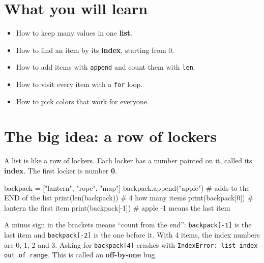 
\section{What you will learn}
\begin{itemize}[leftmargin=1.2em]
  \item How to keep many values in one \textbf{list}.
  \item How to find an item by its \textbf{index}, starting from 0.
  \item How to add items with \texttt{append} and count them with \texttt{len}.
  \item How to visit every item with a \texttt{for} loop.
  \item How to pick colors that work for everyone.
\end{itemize}

\section{The big idea: a row of lockers}
A list is like a row of lockers. Each locker has a number painted on it, called its \textbf{index}.
The first locker is number \textbf{0}.

\begin{center}
\end{center}

\begin{pycode}
backpack = ["lantern", "rope", "map"]
backpack.append("apple")    # adds to the END of the list
print(len(backpack))        # 4   how many items
print(backpack[0])          # lantern   the first item
print(backpack[-1])         # apple   -1 means the last item
\end{pycode}
A minus sign in the brackets means \enquote{count from the end}: \texttt{backpack[-1]} is the last item and
\texttt{backpack[-2]} is the one before it.
With 4 items, the index numbers are 0, 1, 2 and 3. Asking for \texttt{backpack[4]} crashes with
\texttt{IndexError: list index out of range}. This is called an \textbf{off-by-one} bug.

